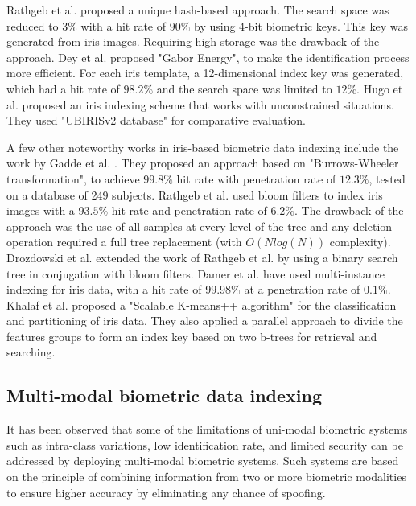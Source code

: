 Rathgeb et al. \cite{Rathgeb2010iris} proposed a unique hash-based approach.
The search space was reduced to $3\%$ with a hit rate of $90\%$ by using 4-bit biometric keys.
This key was generated from iris images.
Requiring high storage was the drawback of the approach. 
Dey et al. \cite{Dey2012gabor} proposed "Gabor Energy", to make the identification process more efficient.
For each iris template, a 12-dimensional index key was generated, which had a hit rate of $98.2\%$ 
and the search space was limited to $12\%$. 
Hugo et al. \cite{hugo2013iris} proposed an iris indexing scheme that works with unconstrained situations.
They used "UBIRISv2 database" \cite{hugo2010iris} for comparative evaluation.

A few other noteworthy works in iris-based biometric data indexing include the work by Gadde et al.
\cite{Gadde2010iris}. They proposed an approach based on "Burrows-Wheeler
transformation"\cite{Burrows1994ablock}, to achieve $99.8\%$ hit rate with penetration rate of $12.3\%$, 
tested on a database of 249 subjects.
Rathgeb et al. \cite{Rathgeb2015iris} used bloom filters to index iris images with a $93.5\%$ hit rate and penetration rate of $6.2\%$.
The drawback of the approach was the use of all samples at every level of the tree and 
any deletion operation required a full tree replacement (with $O(Nlog(N))$ complexity). 
Drozdowski et al. \cite{Drozdowski2018iris} extended the work of Rathgeb et al. \cite{Rathgeb2015iris}
by using a binary search tree in conjugation with bloom filters. 
Damer et al. \cite{Damer2017iris} have used multi-instance indexing for iris data, with a hit rate of $99.98\%$ at a penetration rate of $0.1\%$. 
Khalaf et al. \cite{Khalaf2018iris,khalaf2018efficient} proposed
a "Scalable K-means++ algorithm" for the classification and partitioning of iris
data. They also applied a parallel approach to divide the features groups to form an index key based on two b-trees
for retrieval and searching.


\subsection{Multi-modal biometric data indexing}
It has been observed that some of the limitations of uni-modal biometric systems
such as intra-class variations, low identification rate, and limited security \cite{Sarier2018multi} can
be addressed by deploying multi-modal biometric systems. Such systems are based
on the principle of combining information from two or more biometric modalities to ensure higher accuracy by eliminating any chance of spoofing.

